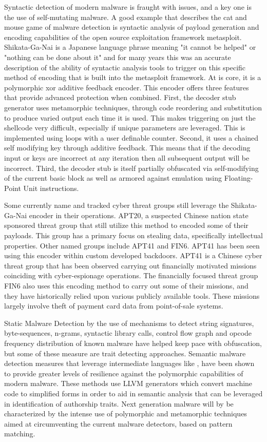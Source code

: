 \documentclass[12pt]{report}
\begin{document}
Syntactic detection of modern malware is fraught with issues, and a key one is the use of self-mutating malware.  A good example that describes the cat and mouse game of malware detection is syntactic analysis of payload generation and encoding capabilities of the open source exploitation framework metasploit.  Shikata-Ga-Nai is a Japanese language phrase meaning "it cannot be helped" or "nothing can be done about it" and for many years this was an accurate description of the ability of syntactic analysis tools to trigger on this specific method of encoding that is built into the metasploit framework.  At is core, it is a polymorphic xor additive feedback encoder.  This encoder offers three features that provide advanced protection when combined.  First, the decoder stub generator uses metamorphic techniques, through code reordering and substitution to produce varied output each time it is used.  This makes triggering on just the shellcode very difficult, especially if unique parameters are leveraged.  This is implemented using loops with a user definable counter.  Second, it uses a chained self modifying key through additive feedback. This means that if the decoding input or keys are incorrect at any iteration then all subsequent output will be incorrect.  Third, the decoder stub is itself partially obfuscated via self-modifying of the current basic block as well as armored against emulation using Floating-Point Unit instructions.  

Some currently name and tracked cyber threat groups still leverage the Shikata-Ga-Nai encoder in their operations.  APT20, a suspected Chinese nation state sponsored threat group that still utilize this method to encoded some of their payloads.  This group has a primary focus on stealing data, specifically intellectual properties.  Other named groups include APT41 and FIN6.  APT41 has been seen using this encoder within custom developed backdoors.  APT41 is a Chinese cyber threat group that has been observed carrying out financially motivated missions coinciding with cyber-espionage operations.  The financially focused threat group FIN6 also uses this encoding method to carry out some of their missions, and they have historically relied upon various publicly available tools. These missions largely involve theft of payment card data from point-of-sale systems. 

Static Malware Detection by the use of mechanisms to detect string signatures, byte-sequences, n-grams, syntactic library calls, control flow graph and opcode frequency distribution of known malware have helped keep pace with obfuscation, but some of these measure are trait detecting approaches.  Semantic malware detection measures that leverage intermediate languages like \cite{christodorescu2005semantics}, \cite{ranjan2016boolean} have been shown to provide greater levels of resilience against the polymorphic capabilities of modern malware.  These methods use LLVM generators which convert machine code to simplified forms in order to aid in semantic analysis that can be leveraged in identification of authorship traits.  Next generation malware will by be characterized by the intense use of polymorphic and metamorphic techniques aimed at circumventing the current malware detectors, based on pattern matching. \cite{bruschidetecting}
\end{document}
